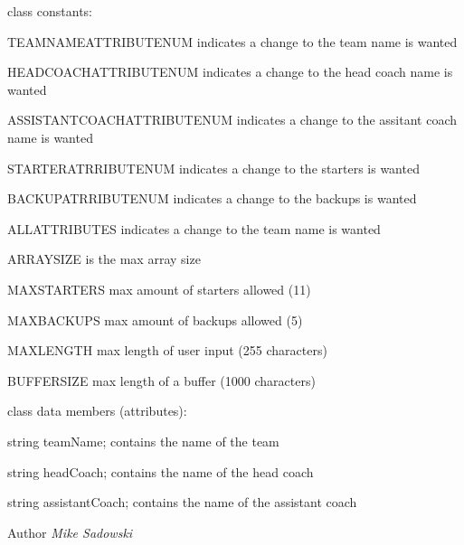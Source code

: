 \begin{DoxyItemize}
\item class constants\-:
\begin{DoxyItemize}
\item T\-E\-A\-M\-N\-A\-M\-E\-A\-T\-T\-R\-I\-B\-U\-T\-E\-N\-U\-M indicates a change to the team name is wanted
\item H\-E\-A\-D\-C\-O\-A\-C\-H\-A\-T\-T\-R\-I\-B\-U\-T\-E\-N\-U\-M indicates a change to the head coach name is wanted
\item A\-S\-S\-I\-S\-T\-A\-N\-T\-C\-O\-A\-C\-H\-A\-T\-T\-R\-I\-B\-U\-T\-E\-N\-U\-M indicates a change to the assitant coach name is wanted
\item S\-T\-A\-R\-T\-E\-R\-A\-T\-R\-R\-I\-B\-U\-T\-E\-N\-U\-M indicates a change to the starters is wanted
\item B\-A\-C\-K\-U\-P\-A\-T\-R\-R\-I\-B\-U\-T\-E\-N\-U\-M indicates a change to the backups is wanted
\item A\-L\-L\-A\-T\-T\-R\-I\-B\-U\-T\-E\-S indicates a change to the team name is wanted
\item A\-R\-R\-A\-Y\-S\-I\-Z\-E is the max array size
\item M\-A\-X\-S\-T\-A\-R\-T\-E\-R\-S max amount of starters allowed (11)
\item M\-A\-X\-B\-A\-C\-K\-U\-P\-S max amount of backups allowed (5)
\item M\-A\-X\-L\-E\-N\-G\-T\-H max length of user input (255 characters)
\item B\-U\-F\-F\-E\-R\-S\-I\-Z\-E max length of a buffer (1000 characters)
\end{DoxyItemize}
\end{DoxyItemize}


\begin{DoxyItemize}
\item class data members (attributes)\-:
\begin{DoxyItemize}
\item string team\-Name; contains the name of the team
\item string head\-Coach; contains the name of the head coach
\item string assistant\-Coach; contains the name of the assistant coach
\end{DoxyItemize}
\end{DoxyItemize}

\begin{DoxyAuthor}{Author}
{\itshape Mike Sadowski} 
\end{DoxyAuthor}


